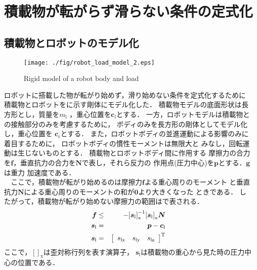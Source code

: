 \section{積載物が転がらず滑らない条件の定式化}
\subsection{積載物とロボットのモデル化}
\label {2.1}
\begin{figure}[t]
    \begin{center}
    \texttt{[image: ./fig/robot\_load\_model\_2.eps]}
    \caption{Rigid model of a robot body and load}
  \end{center}
  \end{figure}
  
ロボットに搭載した物が転がり始めず，滑り始めない条件を定式化するために
積載物とロボットをに示す剛体にモデル化した．
積載物モデルの底面形状は長方形とし，質量を${m}_{\mathrm{l}}$
，重心位置を$\bm{c}_{\mathrm{l}}$とする．
一方，ロボットモデルは積載物との接触部分のみを考慮するために，
ボディのみを長方形の剛体としてモデル化し，重心位置を
$\bm{c}_{\mathrm{r}}$とする．
また，ロボットボディの並進運動による影響のみに着目するために，
ロボットボディの慣性モーメントは無限大と
みなし，回転運動は生じないものとする．
積載物とロボットボディ間に作用する
摩擦力の合力を$\bm{f}$，垂直抗力の合力を$\bm{N}$で表し，それら反力の
作用点(圧力中心)を$\bm{p}$とする．$\bm{g}$は重力
加速度である．\\%
　ここで，積載物が転がり始めるのは摩擦力$\bm{f}$よる重心周りのモーメント
と垂直抗力$\bm{N}$による重心周りのモーメントの和が$\bm{0}$より大きくなった
ときである．
したがって，積載物が転がり始めない摩擦力の範囲はで表される．
\begin{eqnarray}
  \equlabel{1.1}
  \bm{f} &\leq&-{[\bm{s}_{\mathrm{l}}]}_{\mathrm{x}}^{-1}{[\bm{s}_{\mathrm{l}}]}_{\mathrm{x}}\bm{N}\\
  \bm{s}_{\mathrm{l}} &=&\bm{p}-\bm{c}_{\mathrm{l}}\\
  \bm{s}_{\mathrm{l}} &=&\left[
    \begin{array}{ccc}
      {s}_{\mathrm{lx}} & {s}_{\mathrm{ly}} & {s}_{\mathrm{lz}}
    \end{array}
    \right]^{\mathrm{T}}
\end{eqnarray}
ここで，${[　]}_{\mathrm{x}}$は歪対称行列を表す演算子，
$\bm{s}_{\mathrm{l}}$は積載物の重心から見た時の圧力中心の位置である．

